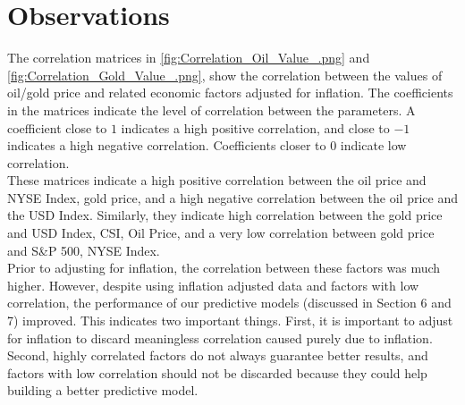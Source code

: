 \documentclass[runningheads]{llncs}
\begin{document}
\newpage

\section{Observations}

\noindent The correlation matrices in \autoref{fig:Correlation_Oil_Value_.png} and \autoref{fig:Correlation_Gold_Value_.png}, show the correlation between the values of oil/gold price and related economic factors adjusted for inflation. The coefficients in the matrices indicate the level of correlation between the parameters. A coefficient close to $1$ indicates a high positive correlation, and close to $-1$ indicates a high negative correlation. Coefficients closer to $0$ indicate low correlation. \\

\noindent These matrices indicate a high positive correlation between the oil price and NYSE Index, gold price, and a high negative correlation between the oil price and the USD Index. Similarly, they indicate high correlation between the gold price and USD Index, CSI, Oil Price, and a very low correlation between gold price and S\&P 500, NYSE Index.\\

\noindent Prior to adjusting for inflation, the correlation between these factors was much higher. However, despite using inflation adjusted data and factors with low correlation, the performance of our predictive models (discussed in Section 6 and 7) improved. This indicates two important things. First, it is important to adjust for inflation to discard meaningless correlation caused purely due to inflation. Second, highly correlated factors do not always guarantee better results, and factors with low correlation should not be discarded because they could help building a better predictive model.     
\end{document}

